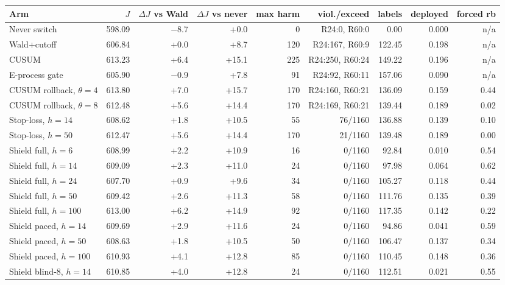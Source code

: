\begin{tabular}{@{}l r r r r r r r r@{}}
\toprule
Arm & $J$ & $\Delta J$ vs Wald & $\Delta J$ vs never & max harm & viol./exceed & labels & deployed & forced rb \\
\midrule
Never switch & 598.09 & $-$8.7 & +0.0 & 0 & R24:0, R60:0 & 0.00 & 0.000 & n/a \\
Wald+cutoff & 606.84 & +0.0 & +8.7 & 120 & R24:167, R60:9 & 122.45 & 0.198 & n/a \\
CUSUM & 613.23 & +6.4 & +15.1 & 225 & R24:250, R60:24 & 149.22 & 0.196 & n/a \\
E-process gate & 605.90 & $-$0.9 & +7.8 & 91 & R24:92, R60:11 & 157.06 & 0.090 & n/a \\
CUSUM rollback, $\theta=4$ & 613.80 & +7.0 & +15.7 & 170 & R24:160, R60:21 & 136.09 & 0.159 & 0.44 \\
CUSUM rollback, $\theta=8$ & 612.48 & +5.6 & +14.4 & 170 & R24:169, R60:21 & 139.44 & 0.189 & 0.02 \\
Stop-loss, $h=14$ & 608.62 & +1.8 & +10.5 & 55 & 76/1160 & 136.88 & 0.139 & 0.10 \\
Stop-loss, $h=50$ & 612.47 & +5.6 & +14.4 & 170 & 21/1160 & 139.48 & 0.189 & 0.00 \\
Shield full, $h=6$ & 608.99 & +2.2 & +10.9 & 16 & 0/1160 & 92.84 & 0.010 & 0.54 \\
Shield full, $h=14$ & 609.09 & +2.3 & +11.0 & 24 & 0/1160 & 97.98 & 0.064 & 0.62 \\
Shield full, $h=24$ & 607.70 & +0.9 & +9.6 & 34 & 0/1160 & 105.27 & 0.118 & 0.44 \\
Shield full, $h=50$ & 609.42 & +2.6 & +11.3 & 58 & 0/1160 & 111.76 & 0.135 & 0.39 \\
Shield full, $h=100$ & 613.00 & +6.2 & +14.9 & 92 & 0/1160 & 117.35 & 0.142 & 0.22 \\
Shield paced, $h=14$ & 609.69 & +2.9 & +11.6 & 24 & 0/1160 & 94.86 & 0.041 & 0.59 \\
Shield paced, $h=50$ & 608.63 & +1.8 & +10.5 & 50 & 0/1160 & 106.47 & 0.137 & 0.34 \\
Shield paced, $h=100$ & 610.93 & +4.1 & +12.8 & 85 & 0/1160 & 110.45 & 0.148 & 0.36 \\
Shield blind-8, $h=14$ & 610.85 & +4.0 & +12.8 & 24 & 0/1160 & 112.51 & 0.021 & 0.55 \\
\bottomrule
\end{tabular}
